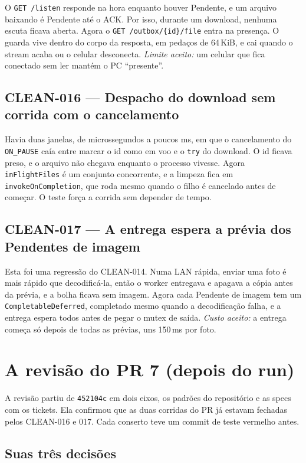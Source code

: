 \documentclass[11pt,a4paper]{article}
\begin{document}
O \texttt{GET /listen} responde na hora enquanto houver Pendente, e um arquivo
baixando é Pendente até o ACK. Por isso, durante um download, nenhuma escuta
ficava aberta. Agora o \texttt{GET /outbox/\{id\}/file} entra na presença. O
guarda vive dentro do corpo da resposta, em pedaços de 64\,KiB, e cai quando o
stream acaba ou o celular desconecta. \emph{Limite aceito:} um celular que
fica conectado sem ler mantém o PC ``presente''.

\subsection*{CLEAN-016 --- Despacho do download sem corrida com o cancelamento}

Havia duas janelas, de microssegundos a poucos ms, em que o cancelamento do
\texttt{ON\_PAUSE} caía entre marcar o id como em voo e o \texttt{try} do
download. O id ficava preso, e o arquivo não chegava enquanto o processo
vivesse. Agora \texttt{inFlightFiles} é um conjunto concorrente, e a limpeza
fica em \texttt{invokeOnCompletion}, que roda mesmo quando o filho é cancelado
antes de começar. O teste força a corrida sem depender de tempo.

\subsection*{CLEAN-017 --- A entrega espera a prévia dos Pendentes de imagem}

Esta foi uma regressão do CLEAN-014. Numa LAN rápida, enviar uma foto é mais
rápido que decodificá-la, então o worker entregava e apagava a cópia antes da
prévia, e a bolha ficava sem imagem. Agora cada Pendente de imagem tem um
\texttt{CompletableDeferred}, completado mesmo quando a decodificação falha, e
a entrega espera todos antes de pegar o mutex de saída. \emph{Custo aceito:}
a entrega começa só depois de todas as prévias, uns 150\,ms por foto.

\section{A revisão do PR 7 (depois do run)}

A revisão partiu de \texttt{452104c} em dois eixos, os padrões do repositório
e as specs com os tickets. Ela confirmou que as duas corridas do PR já
estavam fechadas pelos CLEAN-016 e 017. Cada conserto teve um commit de teste
vermelho antes.

\subsection*{Suas três decisões}
\end{document}

